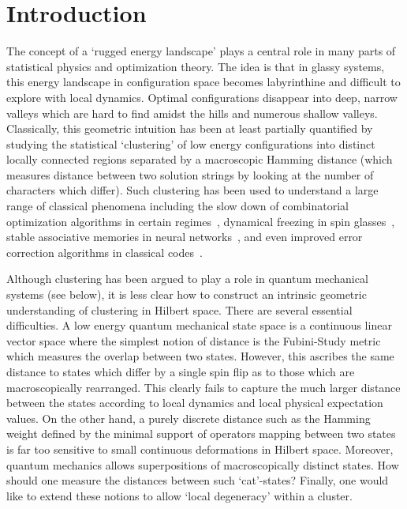 \documentclass[aps,pra,twocolumn,superscriptaddress,amsmath]{revtex4-1}
\begin{document}
\maketitle


\section{Introduction} %
\label{sec:introduction}

The concept of a `rugged energy landscape' plays a central role in many parts of statistical physics and optimization theory.
The idea is that in glassy systems, this energy landscape in configuration space becomes labyrinthine and difficult to explore with local dynamics. 
Optimal configurations disappear into deep, narrow valleys which are hard to find amidst the hills and numerous shallow valleys. 
Classically, this geometric intuition has been at least partially quantified by studying the statistical `clustering' of low energy configurations into distinct locally connected regions separated by a macroscopic Hamming distance (which measures distance between two solution strings by looking at the number of characters which differ).
Such clustering has been used to understand a large range of classical phenomena including the slow down of combinatorial optimization algorithms in certain regimes~\cite{Mezard2005, Mulet2002, Cocco2003, Martin2004}, dynamical freezing in spin glasses~\cite{SpinGlassTheoryBook1986}, stable associative memories in neural networks~\cite{Hopfield1982}, and even improved error correction algorithms in classical codes~\cite{Montanari2001}.


Although clustering has been argued to play a role in quantum mechanical systems (see below), it is less clear how to construct an intrinsic geometric understanding of clustering in Hilbert space.
There are several essential difficulties. 
A low energy quantum mechanical state space is a continuous linear vector space where the simplest notion of distance is the Fubini-Study metric which measures the overlap between two states. However, this ascribes the same distance to states which differ by a single spin flip as to those which are macroscopically rearranged. 
This clearly fails to capture the much larger distance between the states according to local dynamics and local physical expectation values.
%
On the other hand, a purely discrete distance such as the Hamming weight defined by the minimal support of operators mapping between two states is far too sensitive to small continuous deformations in Hilbert space. 
%
Moreover, quantum mechanics allows superpositions of macroscopically distinct states. 
How should one measure the distances between such `cat'-states?
%
Finally, one would like to extend these notions to allow `local degeneracy' within a cluster.
\end{document}
